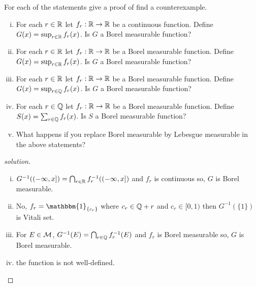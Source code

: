 \begin{problem}
  For each of the statements give a proof of find a counterexample.
  \begin{enumerate}[(i)]
    \item For each $r \in \mathbb R$ let $f_r : \mathbb R \to \mathbb R$ be a continuous function. Define 
    $G(x) = \sup_{r \in \mathbb R} f_r(x)$. Is $G$ a Borel measurable function?
    \item For each $r \in \mathbb R$ let $f_r : \mathbb R \to \mathbb R$ be a Borel measurable function. 
    Define $G(x) = \sup_{r \in \mathbb R} f_r(x)$. Is $G$ a Borel measurable function?
    \item For each $r \in \mathbb R$ let $f_r : \mathbb R \to \mathbb R$ be a Borel measurable function.
    Define $G(x) = \sup_{r \in \mathbb Q} f_r(x)$. Is $G$ a Borel measurable function?
    \item For each $r \in \mathbb Q$ let $f_r : \mathbb R \to \mathbb R$ be a Borel measurable function.
    Define $S(x) = \sum_{r \in \mathbb Q} f_r(x)$. Is $S$ a Borel measurable function?
    \item What happens if you replace Borel measurable by Lebesgue measurable in the above statements?
  \end{enumerate}
\end{problem}

\begin{proof}[solution]
  \begin{enumerate}[(i)]
    \item $G^{-1}((-\infty, x]) = \bigcap_{r \in \mathbb R} f_r^{-1}((-\infty, x])$ and $f_r$ is continuous so, $G$ is Borel measurable.
    \item No, $f_r = \mathbbm{1}_{\{c_r\}}$ where $c_r \in \mathbb Q + r$ and $c_r \in [0, 1)$ then $G^{-1}(\{1\})$ is Vitali set.
    \item For $E \in \mathcal M$, $G^{-1}(E) = \bigcap_{r \in \mathbb Q} f_r^{-1}(E)$ and $f_r$ is Borel measurable so, $G$ is Borel measurable.
    \item the function is not well-defined.
  \end{enumerate} 
\end{proof}

